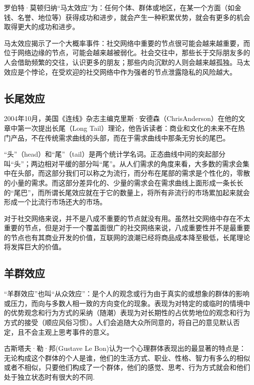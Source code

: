 \documentclass[12pt]{report}
\begin{document}
			罗伯特·莫顿归纳“马太效应”为：任何个体、群体或地区，在某一个方面（如金钱、名誉、地位等）获得成功和进步，就会产生一种积累优势，就会有更多的机会取得更大的成功和进步。
			
			马太效应揭示了一个大概率事件：社交网络中重要的节点很可能会越来越重要，而位于网络边缘的节点，可能会越来越被弱化。社会交往中，那些长于交际朋友多的人会借助频繁的交往，认识更多的朋友；那些内向沉默的人则会越来越孤独。马太效应是个悖论，在受欢迎的社交网络中作为强者的节点泄露隐私的风险越大。
			
		\subsection{长尾效应}
		
			2004年10月，美国《连线》杂志主编克里斯·安德森（ChrisAnderson）在他的文章中第一次提出长尾（Long Tail）理论，他告诉读者：商业和文化的未来不在热门产品，不在传统需求曲线的头部，而在于需求曲线中那条无穷长的尾巴。
			
			“头”（head）和“尾”（tail）是两个统计学名词。正态曲线中间的突起部分叫“头”；两边相对平缓的部分叫“尾”。从人们需求的角度来看，大多数的需求会集中在头部，而这部分我们可以称之为流行，而分布在尾部的需求是个性化的，零散的小量的需求。而这部分差异化的、少量的需求会在需求曲线上面形成一条长长的“尾巴”，而所谓长尾效应就在于它的数量上，将所有非流行的市场累加起来就会形成一个比流行市场还大的市场。
			
			对于社交网络来说，并不是八成不重要的节点就没有用。虽然社交网络中存在不太重要的节点，但是对于一个覆盖面很广的社交网络来说，八成重要性并不是最重要的节点也有其商业开发的价值，互联网的浪潮已经将商品成本降至极低，长尾理论将发挥巨大的价值。
			
		\subsection{羊群效应}
		
			“羊群效应”也叫“从众效应”：是个人的观念或行为由于真实的或想象的群体的影响或压力，而向与多数人相一致的方向变化的现象。表现为对特定的或临时的情境中的优势观念和行为方式的采纳（随潮）表现为对长期性的占优势地位的观念和行为方式的接受（顺应风俗习惯）。人们会追随大众所同意的，将自己的意见默认否定，且不会主观上思考事件的意义。
			
			古斯塔夫·勒·邦(Gustave Le Bon)认为一个心理群体表现出的最显著的特点是：无论构成这个群体的个人是谁，他们的生活方式、职业、性格、智力有多么的相似或者不相似，只要他们构成了一个群体，他们的感觉、思考、行为方式就会和他们处于独立状态时有很大的不同.
			
\end{document}
